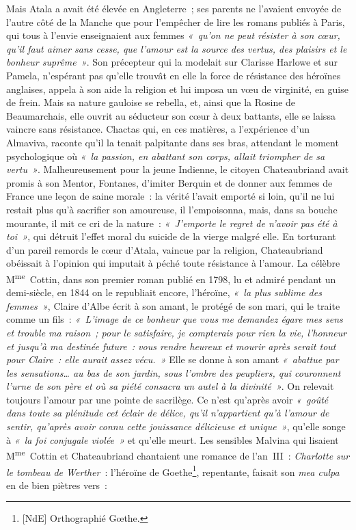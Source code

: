 \documentclass[french,twoside]{book} %
\begin{document}
\noindent Mais Atala a avait été élevée en Angleterre ; ses parents ne l’avaient envoyée de l’autre côté de la Manche que pour l’empêcher de lire les romans publiés à Paris, qui tous à l’envie enseignaient aux femmes \emph{« qu’on ne peut résister à son cœur, qu’il faut aimer sans cesse, que l’amour est la source des vertus, des plaisirs et le bonheur suprême »}. Son précepteur qui la modelait sur Clarisse Harlowe et sur Pamela, n’espérant pas qu’elle trouvât en elle la force de résistance des héroïnes anglaises, appela à son aide la religion et lui imposa un vœu de virginité, en guise de frein. Mais sa nature gauloise se rebella, et, ainsi que la Rosine de Beaumarchais, elle ouvrit au séducteur son cœur à deux battants, elle se laissa vaincre sans résistance. Chactas qui, en ces matières, a l’expérience d’un Almaviva, raconte qu’il la tenait palpitante dans ses bras, attendant le moment psychologique où \emph{« la passion, en abattant son corps, allait triompher de sa vertu »}. Malheureusement pour la jeune Indienne, le citoyen Chateaubriand avait promis à son Mentor, Fontanes, d’imiter Berquin et de donner aux femmes de France une leçon de saine morale : la vérité l’avait emporté si loin, qu’il ne lui restait plus qu’à sacrifier son amoureuse, il l’empoisonna, mais, dans sa bouche mourante, il mit ce cri de la nature : \emph{« J’emporte le regret de n’avoir pas été à toi »}, qui détruit l’effet moral du suicide de la vierge malgré elle. En torturant d’un pareil remords  
\label{p603}le cœur d’Atala, vaincue par la religion, Chateaubriand obéissait à l’opinion qui imputait à péché toute résistance à l’amour. La célèbre M\textsuperscript{me} Cottin, dans son premier roman publié en 1798, lu et admiré pendant un demi-siècle, en 1844 on le republiait encore, l’héroïne, \emph{« la plus sublime des femmes »}, Claire d’Albe écrit à son amant, le protégé de son mari, qui le traite comme un fils : \emph{« L’image de ce bonheur que vous me demandez égare mes sens et trouble ma raison ; pour le satisfaire, je compterais pour rien la vie, l’honneur et jusqu’à ma destinée future : vous rendre heureux et mourir après serait tout pour Claire : elle aurait assez vécu. »} Elle se donne à son amant \emph{« abattue par les sensations… au bas de son jardin, sous l’ombre des peupliers, qui couronnent l’urne de son père et où sa piété consacra un autel à la divinité »}. On relevait toujours l’amour par une pointe de sacrilège. Ce n’est qu’après avoir \emph{« goûté dans toute sa plénitude cet éclair de délice, qu’il n’appartient qu’à l’amour de sentir, qu’après avoir connu cette jouissance délicieuse et unique »}, qu’elle songe à \emph{« la foi conjugale violée »} et qu’elle meurt. Les sensibles Malvina qui lisaient M\textsuperscript{me} Cottin et Chateaubriand chantaient une romance de l’an III : \emph{Charlotte sur le tombeau de Werther} : l’héroïne de Goethe\footnote{[NdE] Orthographié Gœthe.}, repentante, faisait son {\itshape mea culpa} en de bien piètres vers :\par
\end{document}
